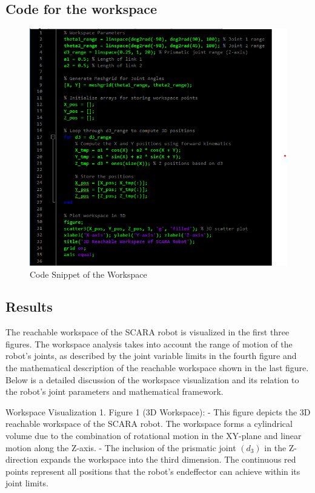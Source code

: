 \documentclass[12pt]{report}
\begin{document}
\subsection{Code for the workspace}
\begin{figure}[H]
	\centering
	\includegraphics[scale=1]{WC} %
	\caption{Code Snippet of the Workspace}
	\label{W1} %
\end{figure}
\subsection{Results}
The reachable workspace of the SCARA robot is visualized in the first three figures. The workspace analysis takes into account the range of motion of the robot's joints, as described by the joint variable limits in the fourth figure and the mathematical description of the reachable workspace shown in the last figure. Below is a detailed discussion of the workspace visualization and its relation to the robot's joint parameters and mathematical framework.

Workspace Visualization
1. Figure 1 (3D Workspace):
- This figure depicts the 3D reachable workspace of the SCARA robot. The workspace forms a cylindrical volume due to the combination of rotational motion in the XY-plane and linear motion along the Z-axis.
- The inclusion of the prismatic joint $\left(d_3\right)$ in the Z-direction expands the workspace into the third dimension. The continuous red points represent all positions that the robot's endeffector can achieve within its joint limits.
\end{document}
